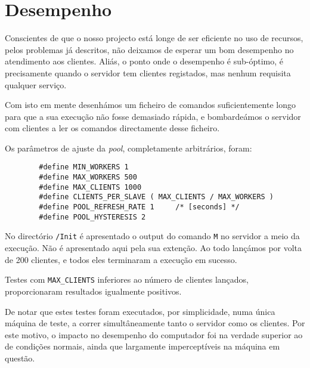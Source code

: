 \section{Desempenho\label{sec:Desempenho}}

	\indent\indent Conscientes de que o nosso projecto está longe de ser eficiente no uso de recursos, pelos problemas já descritos, não deixamos de esperar um bom desempenho no atendimento aos clientes.
	Aliás, o ponto onde o desempenho é sub-óptimo, é precisamente quando o servidor tem clientes registados, mas nenhum requisita qualquer serviço.
	
	Com isto em mente desenhámos um ficheiro de comandos suficientemente longo para que a sua execução não fosse demasiado rápida, e bombardeámos o servidor com clientes a ler os comandos directamente desse ficheiro.
	
	Os parâmetros de ajuste da \emph{pool}, completamente arbitrários, foram:
	
	\begin{lstlisting}
		#define MIN_WORKERS 1
		#define MAX_WORKERS 500
		#define MAX_CLIENTS 1000
		#define CLIENTS_PER_SLAVE ( MAX_CLIENTS / MAX_WORKERS )
		#define POOL_REFRESH_RATE 1		/* [seconds] */
		#define POOL_HYSTERESIS 2
	\end{lstlisting}

	No directório \verb|/Init| é apresentado o output do comando \verb|M| no servidor a meio da execução.
	Não é apresentado aqui pela sua extenção.
	Ao todo lançámos por volta de 200 clientes, e todos eles terminaram a execução em sucesso.
	
	Testes com \verb|MAX_CLIENTS| inferiores ao número de clientes lançados, proporcionaram resultados igualmente positivos.
	
	De notar que estes testes foram executados, por simplicidade, numa única máquina de teste, a correr simultâneamente tanto o servidor como os clientes.
	Por este motivo, o impacto no desempenho do computador foi na verdade superior ao de condições normais, ainda que largamente imperceptíveis na máquina em questão.
	
	
\clearpage
